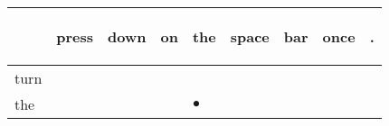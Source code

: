 \documentclass[landscape]{article}
\newcommand{\ssp}{\hspace{2pt}}
\newcommand{\mex}{\cellcolor{g}$\bullet$}
\begin{document}
\noindent\begin{tabular}{|l|p{10pt}|p{10pt}|p{10pt}|p{10pt}|p{10pt}|p{10pt}|p{10pt}|p{10pt}|}
\hline
&\begin{sideways}\cellcolor{ref0}press\hspace{12pt}\end{sideways}&\begin{sideways}\cellcolor{ref1}down\hspace{12pt}\end{sideways}&\begin{sideways}\cellcolor{ref2}on\hspace{12pt}\end{sideways}&\begin{sideways}\cellcolor{ref3}the\hspace{12pt}\end{sideways}&\begin{sideways}\cellcolor{ref4}space\hspace{12pt}\end{sideways}&\begin{sideways}\cellcolor{ref5}bar\hspace{12pt}\end{sideways}&\begin{sideways}\cellcolor{ref6}once\hspace{12pt}\end{sideways}&\begin{sideways}\cellcolor{ref7}.\hspace{12pt}\end{sideways}\\
\hline
\ssp turn \ssp&\hspace{2pt}&\hspace{2pt}&\hspace{2pt}&\hspace{2pt}&\hspace{2pt}&\hspace{2pt}&\hspace{2pt}&\hspace{2pt}\\
\hline
\ssp \cellcolor{ref3}the \ssp&\hspace{2pt}&\hspace{2pt}&\hspace{2pt}&\hspace{2pt}\mex&\hspace{2pt}&\hspace{2pt}&\hspace{2pt}&\hspace{2pt}\\

\end{tabular}
\end{document}
